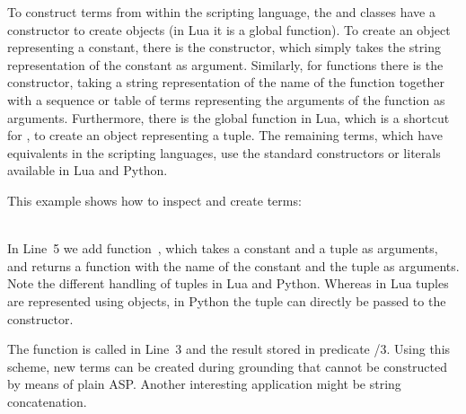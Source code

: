 To construct terms from within the scripting language,
the  and  classes have a constructor to create objects (in Lua it is a global function).
To create an object representing a constant,
there is the  constructor,
which  simply takes the string representation of the constant as argument.
Similarly, for functions
there is the  constructor,
taking a string representation of the name of the function
together with a sequence or table of terms representing the arguments of the function
as arguments.
Furthermore, there is the global function  in Lua,
which is a shortcut for ,
to create an object representing a tuple.
The remaining terms,
which have equivalents in the scripting languages,
use the standard constructors or literals available in Lua and Python.

\begin{example}
This example shows how to inspect and create terms:
\\[-8pt] %
\begin{minipage}[t]{0.57\textwidth}

\end{minipage}
\begin{minipage}[t]{0.45\textwidth}

\end{minipage}\\
In Line~5 we add function~,
which takes a constant and a tuple as arguments,
and returns a function with the name of the constant and the tuple as arguments.
Note the different handling of tuples in Lua and Python.
Whereas in Lua tuples are represented using  objects,
in Python the tuple can directly be passed to the  constructor.

%
%
The function is called in Line~3 and the result stored in predicate /$3$.
Using this scheme,
new terms can be created during grounding
that cannot be constructed by means of plain ASP.
Another interesting application might be string concatenation.
\eexample
\end{example}

